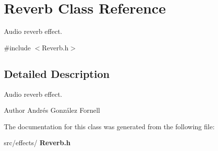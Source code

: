 \section{Reverb Class Reference}
\label{class_reverb}


Audio reverb effect.  




{\ttfamily \#include $<$Reverb.\+h$>$}



\subsection{Detailed Description}
Audio reverb effect. 

\begin{DoxyAuthor}{Author}
Andrés González Fornell 
\end{DoxyAuthor}


The documentation for this class was generated from the following file\+:\begin{DoxyCompactItemize}
\item 
src/effects/\textbf{ Reverb.\+h}\end{DoxyCompactItemize}
